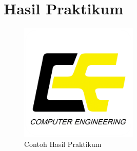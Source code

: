 \chapter*{Hasil Praktikum}


\begin{figure}
    \centering
    \includegraphics[width=0.5\textwidth]{images/logo-tekkom.png} %
    \caption{Contoh Hasil Praktikum} %
    \label{fig:hasil_praktikum} %
\end{figure}



\lipsum[1-2] %


